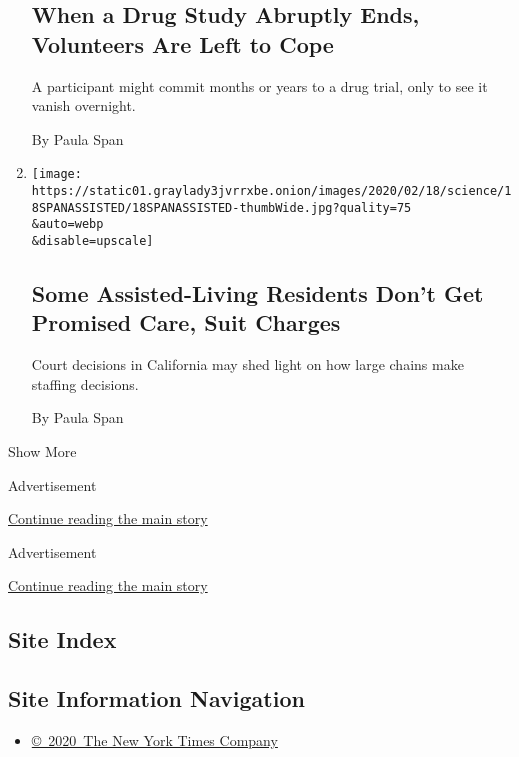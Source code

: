 \begin{enumerate}
{  \subsection{When a Drug Study Abruptly Ends, Volunteers Are Left to
  Cope}\label{when-a-drug-study-abruptly-ends-volunteers-are-left-to-cope}}

  A participant might commit months or years to a drug trial, only to
  see it vanish overnight.

  By Paula Span
\item
  \href{/2020/02/14/health/assisted-living-staffing.html}{}

  \texttt{[image: https://static01.graylady3jvrrxbe.onion/images/2020/02/18/science/18SPANASSISTED/18SPANASSISTED-thumbWide.jpg?quality=75\\\&auto=webp\\\&disable=upscale]}

  \hypertarget{some-assisted-living-residents-dont-get-promised-care-suit-charges}{%
  \subsection{Some Assisted-Living Residents Don't Get Promised Care,
  Suit
  Charges}\label{some-assisted-living-residents-dont-get-promised-care-suit-charges}}

  Court decisions in California may shed light on how large chains make
  staffing decisions.

  By Paula Span
\end{enumerate}

Show More

Advertisement

\protect\hyperlink{after-mid1}{Continue reading the main story}

Advertisement

\protect\hyperlink{after-mktg}{Continue reading the main story}

\hypertarget{site-index}{%
\subsection{Site Index}\label{site-index}}

\hypertarget{site-information-navigation}{%
\subsection{Site Information
Navigation}\label{site-information-navigation}}

\begin{itemize}
\tightlist
\item
  \href{https://help.nytimes3xbfgragh.onion/hc/en-us/articles/115014792127-Copyright-notice}{©~2020~The
  New York Times Company}
\end{itemize}

